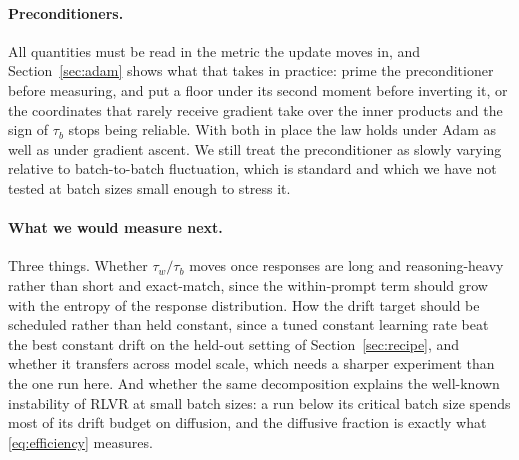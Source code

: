 \paragraph{Preconditioners.} All quantities must be read in the metric the update moves in, and
Section~\ref{sec:adam} shows what that takes in practice: prime the preconditioner before measuring,
and put a floor under its second moment before inverting it, or the coordinates that rarely receive
gradient take over the inner products and the sign of $\tau_b$ stops being reliable. With both in
place the law holds under Adam as well as under gradient ascent. We still treat the preconditioner
as slowly varying relative to batch-to-batch fluctuation, which is standard and which we have not
tested at batch sizes small enough to stress it.

\paragraph{What we would measure next.} Three things. Whether $\tau_w/\tau_b$ moves once responses
are long and reasoning-heavy rather than short and exact-match, since the within-prompt term should
grow with the entropy of the response distribution. How the drift target should be scheduled rather than held constant, since a tuned
constant learning rate beat the best constant drift on the held-out setting of
Section~\ref{sec:recipe}, and whether it transfers across model scale, which needs a sharper
experiment than the one run here. And whether the same decomposition explains the well-known instability of RLVR at small batch
sizes: a run below its critical batch size spends most of its drift budget on diffusion, and the
diffusive fraction is exactly what \eqref{eq:efficiency} measures.
